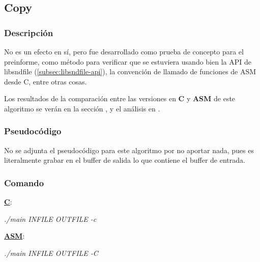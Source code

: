 \subsection{Copy}
\label{subsec:desarrollo-copy}

\subsubsection{Descripción}
\label{subsec:desarrollo-copy-desc}

No es un efecto en sí, pero fue desarrollado como prueba de concepto para el preinforme, como método para verificar que se estuviera usando bien la API de libsndfile (\ref{subsec:libsndfile-api}), la convención de llamado de funciones de ASM desde C, entre otras cosas.

\begin{center}
\end{center}

Los resultados de la comparación entre las versiones en \textbf{C} y \textbf{ASM} de este algoritmo se verán en la sección , y el análisis en .

\subsubsection{Pseudocódigo}
\label{subsec:desarrollo-copy-code}

No se adjunta el pseudocódigo para este algoritmo por no aportar nada, pues es literalmente grabar en el buffer de salida lo que contiene el buffer de entrada.

\subsubsection{Comando}
\label{subsec:desarrollo-copy-call}

\underline{\textbf{C}}:
\begin{center}
 \textit{./main INFILE OUTFILE -c}
\end{center}

\underline{\textbf{ASM}}:
\begin{center}
 \textit{./main INFILE OUTFILE -C}
\end{center}